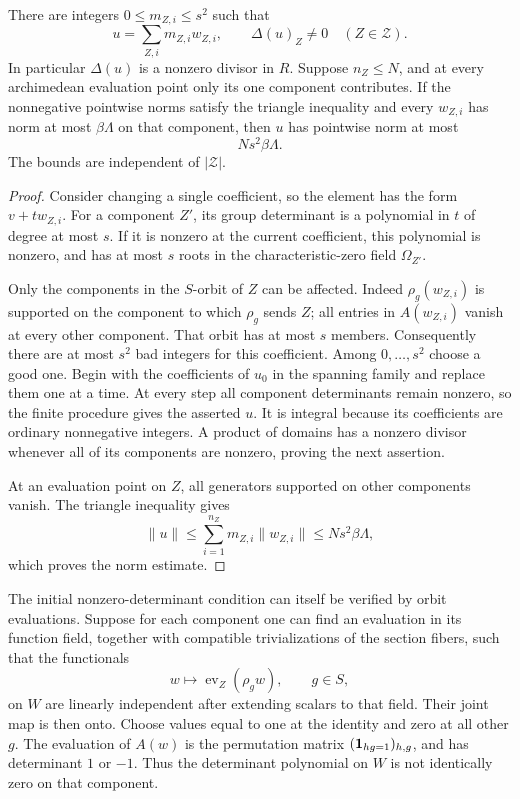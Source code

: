 \begin{srproposition}\label{prop:sr-bounded-determinant-selection}
There are integers \(0\leq m_{Z,i}\leq s^2\) such that
\[
 u=\sum_{Z,i}m_{Z,i}w_{Z,i},\qquad
                       \Delta(u)_Z\ne0\quad(Z\in\mathcal Z).
\]
In particular \(\Delta(u)\) is a nonzero divisor in \(R\).
Suppose \(n_Z\leq N\), and at every archimedean evaluation point
only its one component contributes.
If the nonnegative pointwise norms satisfy the triangle inequality
and every \(w_{Z,i}\) has norm at most \(\beta\Lambda\) on that
component, then \(u\) has pointwise norm at most
\begin{equation}\label{eq:sr-short-determinant-bound}
                              Ns^2\beta\Lambda .
\end{equation}
The bounds are independent of \(|\mathcal Z|\).
\end{srproposition}
\begin{proof}
Consider changing a single coefficient, so the element has the form
\(v+t w_{Z,i}\).  For a component \(Z'\), its group determinant
is a polynomial in \(t\) of degree at most \(s\).
If it is nonzero at the current coefficient, this polynomial
is nonzero, and has at most \(s\) roots in the characteristic-zero
field \(\Omega_{Z'}\).

Only the components in the \(S\)-orbit of \(Z\) can be affected.
Indeed \(\rho_g(w_{Z,i})\) is supported on the component to which
\(\rho_g\) sends \(Z\); all entries in \(A(w_{Z,i})\) vanish at
every other component.  That orbit has at most \(s\) members.
Consequently there are at most \(s^2\) bad integers for this
coefficient.  Among \(0,\ldots,s^2\) choose a good one.
Begin with the coefficients of \(u_0\) in the spanning family and
replace them one at a time.  At every step all component determinants
remain nonzero, so the finite procedure gives the asserted \(u\).
It is integral because its coefficients are ordinary nonnegative
integers.  A product of domains has a nonzero divisor whenever all
of its components are nonzero, proving the next assertion.

At an evaluation point on \(Z\), all generators supported on other
components vanish.  The triangle inequality gives
\[
            \|u\|\leq\sum_{i=1}^{n_Z}m_{Z,i}\|w_{Z,i}\|
                          \leq Ns^2\beta\Lambda ,
\]
which proves the norm estimate.
\end{proof}

The initial nonzero-determinant condition can itself be verified
by orbit evaluations.  Suppose for each component one can find an
evaluation in its function field, together with compatible trivializations
of the section fibers, such that the functionals
\[
                    w\longmapsto \operatorname{ev}_Z(\rho_g w),
                         \qquad g\in S ,
\]
on \(W\) are linearly independent after extending scalars to that
field.  Their joint map is then onto.  Choose values equal to one
at the identity and zero at all other \(g\).
The evaluation of \(A(w)\) is the permutation matrix
\(({\bf1}_{hg=1})_{h,g}\), and has determinant \(1\) or \(-1\).
Thus the determinant polynomial on \(W\) is not identically zero
on that component.

